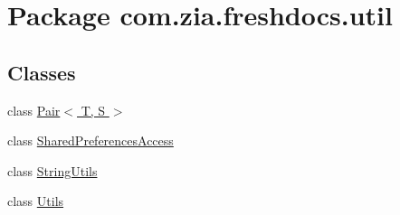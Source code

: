 \hypertarget{namespacecom_1_1zia_1_1freshdocs_1_1util}{\section{Package com.\-zia.\-freshdocs.\-util}
\label{namespacecom_1_1zia_1_1freshdocs_1_1util}
}
\subsection*{Classes}
\begin{DoxyCompactItemize}
\item 
class \hyperlink{classcom_1_1zia_1_1freshdocs_1_1util_1_1_pair_3_01_t_00_01_s_01_4}{Pair$<$ T, S $>$}
\item 
class \hyperlink{classcom_1_1zia_1_1freshdocs_1_1util_1_1_shared_preferences_access}{Shared\-Preferences\-Access}
\item 
class \hyperlink{classcom_1_1zia_1_1freshdocs_1_1util_1_1_string_utils}{String\-Utils}
\item 
class \hyperlink{classcom_1_1zia_1_1freshdocs_1_1util_1_1_utils}{Utils}
\end{DoxyCompactItemize}

